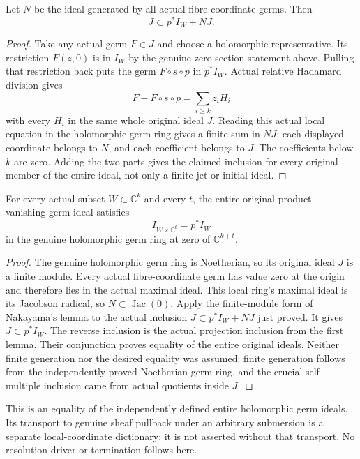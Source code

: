 \begin{lemma}
\label{hir:actual-cylinder-extension-mod-normal}
\leanok
Let $N$ be the ideal generated by all actual fibre-coordinate germs.
Then
\[
 J\subset p^*I_W+NJ.
\]
\end{lemma}
\begin{proof}
Take any actual germ $F\in J$ and choose a holomorphic representative.
Its restriction $F(z,0)$ is in $I_W$ by the genuine zero-section
statement above. Pulling that restriction back puts the germ
$F\circ s\circ p$ in $p^*I_W$. Actual relative Hadamard division gives
\[
 F-F\circ s\circ p=\sum_{i\ge k}z_iH_i
\]
with every $H_i$ in the same whole original ideal $J$. Reading this
actual local equation in the holomorphic germ ring gives a finite
sum in $NJ$: each displayed coordinate belongs to $N$, and each
coefficient belongs to $J$. The coefficients below $k$ are zero.
Adding the two parts gives the claimed inclusion for every original
member of the entire ideal, not only a finite jet or initial ideal.
\end{proof}

\begin{theorem}
\label{hir:actual-cylinder-whole-vanishing-ideal-extension}
\leanok
For every actual subset $W\subset\mathbb C^k$ and every $t$, the entire
original product vanishing-germ ideal satisfies
\[
 I_{W\times\mathbb C^t}=p^*I_W
\]
in the genuine holomorphic germ ring at zero of $\mathbb C^{k+t}$.
\end{theorem}
\begin{proof}
The genuine holomorphic germ ring is Noetherian, so its original ideal
$J$ is a finite module. Every actual fibre-coordinate germ has value
zero at the origin and therefore lies in the actual maximal ideal.
This local ring's maximal ideal is its Jacobson radical, so
$N\subset\operatorname{Jac}(0)$. Apply the finite-module form of
Nakayama's lemma to the actual inclusion
$J\subset p^*I_W+NJ$ just proved. It gives $J\subset p^*I_W$.
The reverse inclusion is the actual projection inclusion from the first
lemma. Their conjunction proves equality of the entire original ideals.
Neither finite generation nor the desired equality was assumed: finite
generation follows from the independently proved Noetherian germ ring,
and the crucial self-multiple inclusion came from actual quotients
inside $J$.
\end{proof}

This is an equality of the independently defined entire holomorphic germ
ideals. Its transport to genuine sheaf pullback under an arbitrary
submersion is a separate local-coordinate dictionary; it is not asserted
without that transport. No resolution driver or termination follows here.
